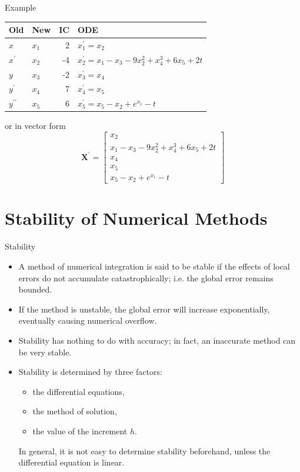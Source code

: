 \documentclass{beamer}
\begin{document}
\begin{frame}{Example}
    \begin{center}
    \begin{tabular}{|l|l|r|l|}
        \hline
        Old  & New  & IC & ODE \\
        \hline
        $x$ & $x_1$ & 2 & $x_1^{\prime}=x_2$ \\
        $x^{\prime}$ & $x_2$ & -4 & $x_2^{\prime}=x_1-x_3-9 x_2^2+x_4^3+6 x_5+2 t$ \\
        $y$ & $x_3$ & -2 & $x_3^{\prime}=x_4$ \\
        $y^{\prime}$ & $x_4$ & 7 & $x_4^{\prime}=x_5$ \\
        $y^{\prime \prime}$ & $x_5$ & 6 & $x_5^{\prime}=x_5-x_2+e^{x_1}-t$\\
        \hline
        \end{tabular}
    \end{center}

        \vspace{0.2in}
        or in vector form
        \[
        \mathbf{X}^{\prime}=\left[\begin{array}{c}x_2 \\ x_1-x_3-9 x_2^2+x_4^3+6 x_5+2 t \\ x_4 \\ x_5 \\ x_5-x_2+e^{x_1}-t\end{array}\right]
        \]
\end{frame}
\section{Stability of Numerical Methods}
\begin{frame}{Stability}
    \begin{itemize}
        \item A method of numerical integration is said to be stable if the effects
        of local errors do not accumulate catastrophically; i.e. the global error remains
        bounded.
        \item  If the method is unstable, the global error will increase exponentially, eventually causing numerical overflow. 
        \item Stability has nothing to do with accuracy; in fact,
        an inaccurate method can be very stable.
        \item     Stability is determined by three factors: 
        \begin{itemize}
            \item the differential equations,
            \item the method of solution,
            \item the value of the increment $h$.
        \end{itemize} 
        In general, it is not easy to determine
        stability beforehand, unless the differential equation is linear.
    \end{itemize}
    \end{frame}
    
\end{document}
